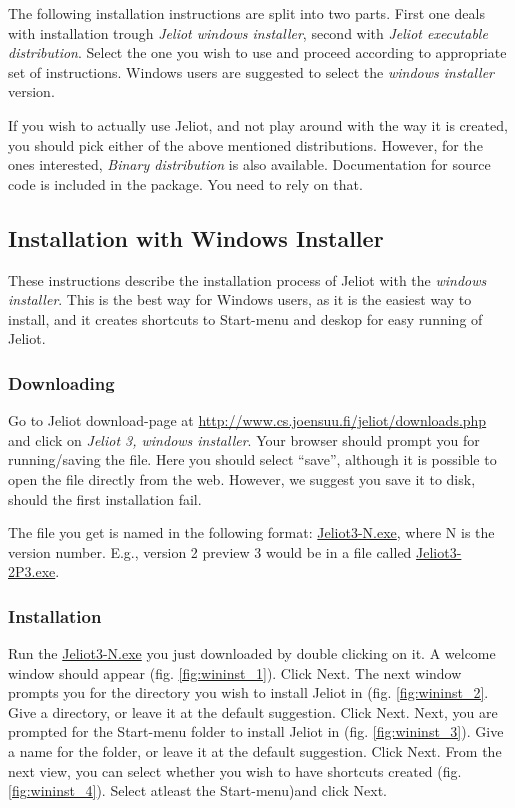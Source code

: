 \documentclass[a4paper,11pt,english]{article}
\newcommand{\jel}{Jeliot}
\newcommand{\file}{\url}
\newcommand{\bu}[1]{\textsf{#1}}
\begin{document}
The following installation instructions are split into two parts. First one deals with installation trough \emph{\jel{} windows installer}, second with \emph{\jel{} executable distribution}. Select the one you wish to use and proceed according to appropriate set of instructions. Windows users are suggested to select the \emph{windows installer} version.

If you wish to actually use \jel{}, and not play around with the way it is created, you should pick either of the above mentioned distributions. However, for the ones interested, \emph{Binary distribution} is also available. Documentation for source code is included in the package. You need to rely on that.

\subsection{Installation with Windows Installer}

These instructions describe the installation process of \jel{} with the \emph{windows installer}. This is the best way for Windows users, as it is the easiest way to install, and it creates shortcuts to Start-menu and deskop for easy running of \jel{}. 

\subsubsection{Downloading}

Go to \jel{} download-page at \url{http://www.cs.joensuu.fi/jeliot/downloads.php} and click on \emph{Jeliot 3, windows installer}. Your browser should prompt you for running/saving the file. Here you should select ``save'', although it is possible to open the file directly from the web. However, we suggest you save it to disk, should the first installation fail.

The file you get is named in the following format: \file{Jeliot3-N.exe}, where N is the version number. E.g., version 2 preview 3 would be in a file called \file{Jeliot3-2P3.exe}.

\subsubsection{Installation}

Run the \file{Jeliot3-N.exe} you just downloaded by double clicking on it. A welcome window should appear (fig. \ref{fig:wininst_1}). Click \bu{Next}. The next window prompts you for the directory you wish to install \jel{} in (fig. \ref{fig:wininst_2}. Give a directory, or leave it at the default suggestion. Click \bu{Next}. Next, you are prompted for the Start-menu folder to install \jel{} in (fig. \ref{fig:wininst_3}). Give a name for the folder, or leave it at the default suggestion. Click \bu{Next}. From the next view, you can select whether you wish to have shortcuts created (fig. \ref{fig:wininst_4}). Select atleast the Start-menu)and click \bu{Next}.
\end{document}
